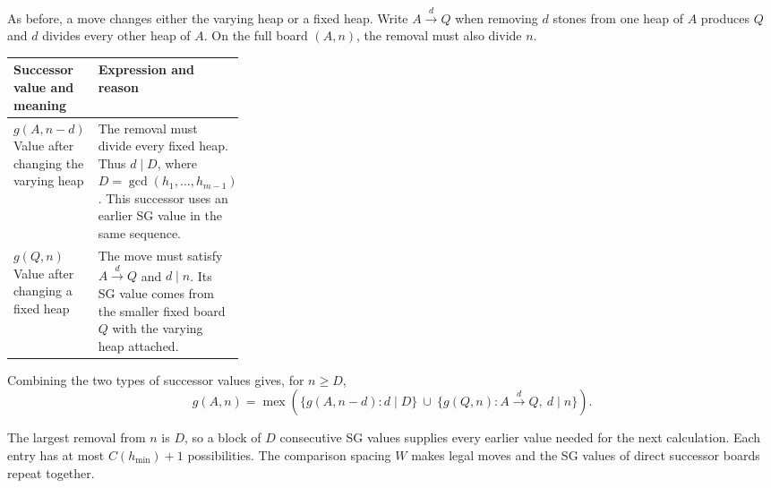 \documentclass[11pt]{article}
\DeclareMathOperator{\mex}{mex}
\begin{document}
As before, a move changes either the varying heap or a fixed heap.
Write $A\xrightarrow{d}Q$ when removing $d$ stones from one
heap of $A$ produces $Q$ and $d$ divides every other heap of $A$.
On the full board $(A,n)$, the removal must also divide $n$.

\begin{center}
\begin{tabularx}{\linewidth}{@{}L{0.30\linewidth}Y@{}}
\toprule
Successor value and meaning & Expression and reason \\
\midrule
$g(A,n-d)$\newline
Value after changing the varying heap
  & The removal must divide every fixed heap. Thus $d\mid D$,
    where $D=\gcd(h_1,\ldots,h_{m-1})$. This successor uses
    an earlier SG value in the same sequence. \\
\addlinespace[9pt]
$g(Q,n)$\newline
Value after changing a fixed heap
  & The move must satisfy $A\xrightarrow{d}Q$ and $d\mid n$.
    Its SG value comes from the smaller fixed board $Q$
    with the varying heap attached. \\
\bottomrule
\end{tabularx}
\end{center}

Combining the two types of successor values gives, for $n\ge D$,
\begin{equation}
 g(A,n)=\mex\left(
 \{g(A,n-d):d\mid D\}\ \cup\
 \{g(Q,n):A\xrightarrow{d}Q,\ d\mid n\}\right).
 \label{eq:periodrec}
\end{equation}

The largest removal from $n$ is $D$, so a block of $D$
consecutive SG values supplies every earlier value needed for
the next calculation. Each entry has at most $C(h_{\min})+1$
possibilities. The comparison spacing $W$ makes legal moves
and the SG values of direct successor boards repeat together.
\end{document}
